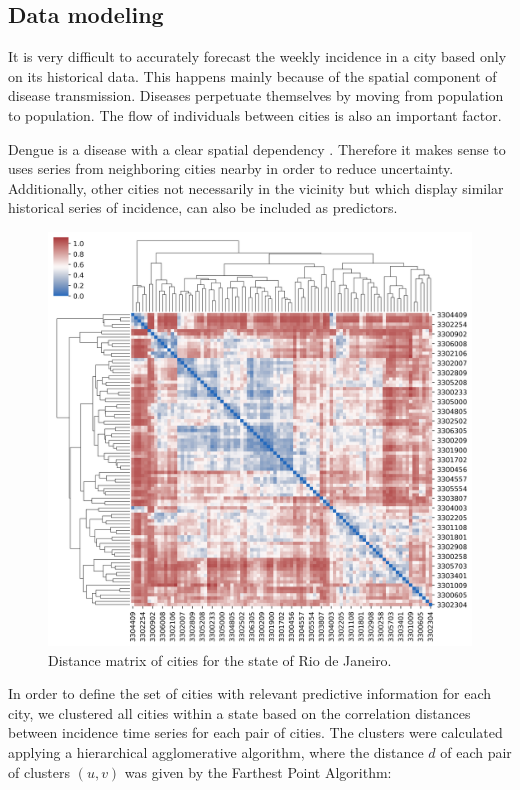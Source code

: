 \documentclass[12pt]{report}
\begin{document}
\subsection{Data modeling}

It is very difficult to accurately forecast the weekly incidence in a city based only on its historical data. This happens mainly because of the spatial component of disease transmission. Diseases perpetuate themselves by moving from population to population. The flow of individuals between cities is also an important factor.

Dengue is a disease with a clear spatial dependency \citep{stoddard2013house,eisen2009use}. Therefore it makes sense to uses series from neighboring cities nearby in order to reduce uncertainty. Additionally, other cities not necessarily in the vicinity but which display similar historical series of incidence, can also be included as predictors.

\begin{figure}[h!]
 \centering
 \includegraphics[scale=0.4]{cluster_corr_RJ.png}
 \caption{Distance matrix of cities for the state of Rio de Janeiro.}
 \label{fig:corr_rj}
\end{figure}

In order to define the set of cities with relevant predictive information for each city, we clustered all cities within a state based on the correlation distances between incidence time series for each pair of cities. The clusters were calculated applying a  hierarchical agglomerative algorithm, where the distance $d$ of each pair of clusters $(u,v)$ was given by the Farthest Point Algorithm:
\end{document}
